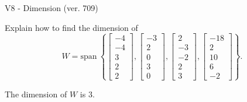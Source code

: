 \begin{exercise}
  \begin{exerciseTitle}V8 - Dimension (ver. 709)\end{exerciseTitle}
  \begin{exerciseStatement}
    Explain how to find the dimension of 
\[W=\mathrm{span}\ \left\{\left[\begin{array}{r}
-4 \\
-4 \\
3 \\
2 \\
2
\end{array}\right] , \left[\begin{array}{r}
-3 \\
2 \\
0 \\
3 \\
0
\end{array}\right] , \left[\begin{array}{r}
2 \\
-3 \\
-2 \\
2 \\
3
\end{array}\right] , \left[\begin{array}{r}
-18 \\
2 \\
10 \\
6 \\
-2
\end{array}\right]\right\}.\]



  \end{exerciseStatement}
  \begin{exerciseAnswer}
   The dimension of \(W\) is  \(3\).
  


  \end{exerciseAnswer}
\end{exercise}